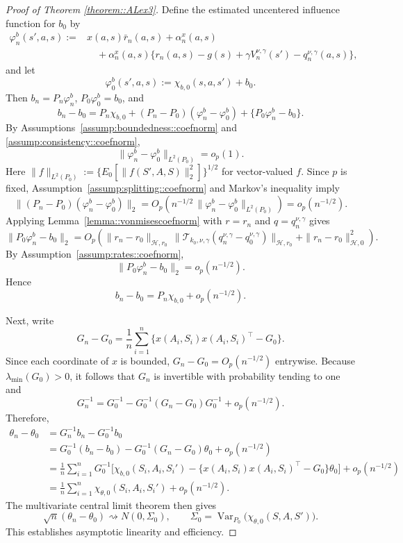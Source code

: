 \documentclass[11pt]{article}
\theoremstyle{plain}
\begin{document}
\begin{proof}[Proof of Theorem \ref{theorem::ALex3}]
Define the estimated uncentered influence function for \(b_0\) by
\[
\begin{aligned}
\varphi_n^b(s',a,s)
:=
&x(a,s)\bar r_n(a,s)
+ \alpha_n^x(a,s) \\
&\quad
+ \alpha_n^x(a,s)\{r_n(a,s)-g(s)+\gamma V_n^{\nu,\gamma}(s')-q_n^{\nu,\gamma}(a,s)\},
\end{aligned}
\]
and let
\[
\varphi_0^b(s',a,s) := \chi_{b,0}(s,a,s') + b_0.
\]
Then \(b_n = P_n\varphi_n^b\), \(P_0\varphi_0^b = b_0\), and
\[
b_n - b_0
=
P_n\chi_{b,0}
+ (P_n-P_0)(\varphi_n^b-\varphi_0^b)
+ \{P_0\varphi_n^b-b_0\}.
\]
By Assumptions~\ref{assump:boundedness::coefnorm} and
\ref{assump:consistency::coefnorm},
\[
\|\varphi_n^b-\varphi_0^b\|_{L^2(P_0)} = o_p(1).
\]
Here \(\|f\|_{L^2(P_0)} := \{E_0[\|f(S',A,S)\|_2^2]\}^{1/2}\) for
vector-valued \(f\).
Since \(p\) is fixed, Assumption~\ref{assump:splitting::coefnorm} and
Markov's inequality imply
\[
\big\|(P_n-P_0)(\varphi_n^b-\varphi_0^b)\big\|_2
=
O_p\!\left(n^{-1/2}\,\|\varphi_n^b-\varphi_0^b\|_{L^2(P_0)}\right)
=
o_p(n^{-1/2}).
\]
Applying Lemma~\ref{lemma::vonmisescoefnorm} with \(r=r_n\) and \(q=q_n^{\nu,\gamma}\)
gives
\[
\|P_0\varphi_n^b-b_0\|_2
=
O_p\!\left(
\|r_n-r_0\|_{\mathcal H,r_0}\,
\bigl\|\mathcal T_{k_0,\nu,\gamma}(q_n^{\nu,\gamma}-q_0^{\nu,\gamma})\bigr\|_{\mathcal H,r_0}
+ \|r_n-r_0\|_{\mathcal H,0}^2
\right).
\]
By Assumption~\ref{assump:rates::coefnorm},
\[
\|P_0\varphi_n^b-b_0\|_2 = o_p(n^{-1/2}).
\]
Hence
\[
b_n-b_0 = P_n\chi_{b,0} + o_p(n^{-1/2}).
\]

Next, write
\[
G_n-G_0
=
\frac1n\sum_{i=1}^n \{x(A_i,S_i)x(A_i,S_i)^\top-G_0\}.
\]
Since each coordinate of \(x\) is bounded, \(G_n-G_0=O_p(n^{-1/2})\) entrywise.
Because \(\lambda_{\min}(G_0)>0\), it follows that \(G_n\) is invertible with
probability tending to one and
\[
G_n^{-1}
=
G_0^{-1} - G_0^{-1}(G_n-G_0)G_0^{-1} + o_p(n^{-1/2}).
\]
Therefore,
\[
\begin{aligned}
\theta_n-\theta_0
&=
G_n^{-1}b_n - G_0^{-1}b_0 \\
&=
G_0^{-1}(b_n-b_0) - G_0^{-1}(G_n-G_0)\theta_0 + o_p(n^{-1/2}) \\
&=
\frac1n\sum_{i=1}^n
G_0^{-1}\Big[
\chi_{b,0}(S_i,A_i,S_i')
- \{x(A_i,S_i)x(A_i,S_i)^\top-G_0\}\theta_0
\Big]
+ o_p(n^{-1/2}) \\
&=
\frac1n\sum_{i=1}^n \chi_{\theta,0}(S_i,A_i,S_i') + o_p(n^{-1/2}).
\end{aligned}
\]
The multivariate central limit theorem then gives
\[
\sqrt n(\theta_n-\theta_0)\rightsquigarrow N(0,\Sigma_0),
\qquad
\Sigma_0 = \operatorname{Var}_{P_0}\!\big(\chi_{\theta,0}(S,A,S')\big).
\]
This establishes asymptotic linearity and efficiency.
\end{proof}
\end{document}
